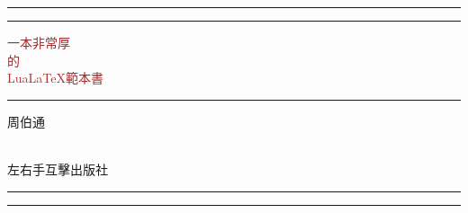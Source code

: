 \begin{titlepage} %

  \centering %


  \rule{\textwidth}{1pt} %

  \vspace{2pt}\vspace{-\baselineskip} %

  \rule{\textwidth}{0.4pt} %

  \vspace{0.1\textheight} %


  \textcolor{Brown}{ %
    {\Huge\iyan 一本非常厚}\\[0.5\baselineskip] %
    {\Large\iyan 的}\\[0.5\baselineskip] %
    {\Huge\iyan Lua\LaTeX 範本書} %
  }

  \vspace{0.025\textheight} %

  \rule{0.3\textwidth}{0.4pt} %

  \vspace{0.1\textheight} %


  {\Large \textsf{周伯通}} %

  \vfill %


  {\large\textcolor{Brown}{\plogo}}\\[0.5\baselineskip] %

  {\large\textsf{左右手互擊出版社}} %

  \vspace{0.1\textheight} %


  \rule{\textwidth}{0.4pt} %

  \vspace{2pt}\vspace{-\baselineskip} %

  \rule{\textwidth}{1pt} %

\end{titlepage}



